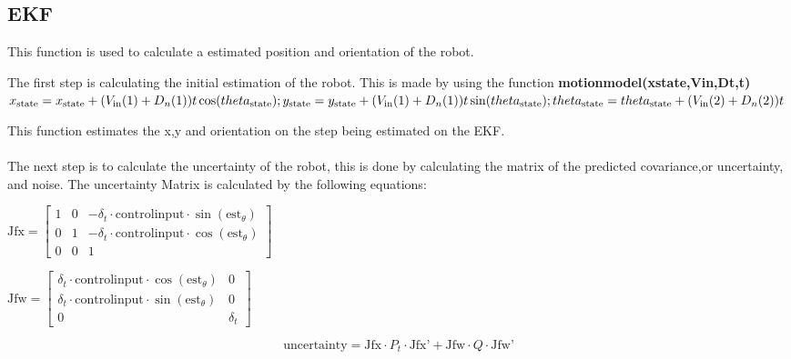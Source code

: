 \documentclass[runningheads]{llncs}
\begin{document}
\subsection*{EKF}
This function is used to calculate a estimated position and orientation of the robot. 


The first step is calculating the  initial estimation of the robot. 
This is made by using the function \textbf{motionmodel(xstate,Vin,Dt,t)}\\
\begin{math}
    x_{\text{state}} = x_{\text{state}} + (V_{\text{in}}(1) + D_n(1))t\cos(theta_{\text{state}}); \\
    y_{\text{state}} = y_{\text{state}} + (V_{\text{in}}(1) + D_n(1))t\sin(theta_{\text{state}}); \\
    theta_{\text{state}} = theta_{\text{state}} + (V_{\text{in}}(2) + D_n(2))t
\end{math}

This function estimates the x,y and orientation on the step being estimated on the EKF. 
\\ \\
The next step is to calculate the uncertainty of the robot, this is done by calculating the matrix of the predicted covariance,or uncertainty, and noise.
The uncertainty Matrix is calculated by the following equations: 
\begin{center}

\begin{math}
    \text{Jfx}=
    \begin{bmatrix} 
        1 & 0 & -\delta_t\cdot\text{controlinput}\cdot\sin(\text{est}_\theta) \\
        0 & 1 & -\delta_t\cdot\text{controlinput}\cdot\cos(\text{est}_\theta) \\
        0 & 0 & 1
    \end{bmatrix}
\end{math}

\begin{math}
    \text{Jfw}=
    \begin{bmatrix}
        \delta_t\cdot\text{controlinput}\cdot\cos(\text{est}_\theta) &0 \\
        \delta_t\cdot\text{controlinput}\cdot\sin(\text{est}_\theta) &0 \\
        0 & \delta_t
    \end{bmatrix}
\end{math}

\begin{equation}
    \text{uncertainty} =\text{Jfx}\cdot P_t \cdot \text{Jfx'}+\text{Jfw}\cdot Q \cdot \text{Jfw'}  
\end{equation}

\end{center}
\end{document}
